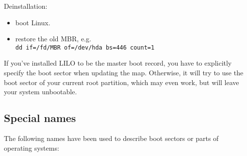 Deinstallation:
\begin{itemize}
  \item boot Linux.
  \item restore the old MBR, e.g. \\
    \verb"dd if=/fd/MBR of=/dev/hda bs=446 count=1"
\end{itemize}

If you've installed LILO to be the master boot record, you have to
explicitly specify the boot sector when updating the map. Otherwise, it
will try to use the boot sector of your current root partition, which
may even work, but will leave your system unbootable.


\subsection{Special names}

The following names have been used to describe boot sectors or parts of
operating systems:


